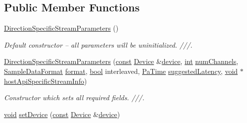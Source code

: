 \subsection*{Public Member Functions}
\begin{DoxyCompactItemize}
\item 
\hyperlink{classportaudio_1_1_direction_specific_stream_parameters_a08e8437d39003fbeb2d7006bfd96ff8f}{Direction\+Specific\+Stream\+Parameters} ()
\begin{DoxyCompactList}\small\item\em Default constructor -- all parameters will be uninitialized. ///. \end{DoxyCompactList}\item 
\hyperlink{classportaudio_1_1_direction_specific_stream_parameters_a10ebe8075f71d3980234ca4d950ac0d3}{Direction\+Specific\+Stream\+Parameters} (\hyperlink{getopt1_8c_a2c212835823e3c54a8ab6d95c652660e}{const} \hyperlink{classportaudio_1_1_device}{Device} \&\hyperlink{classportaudio_1_1_direction_specific_stream_parameters_a1019655e255fed4a30d30d5817e630cf}{device}, \hyperlink{xmltok_8h_a5a0d4a5641ce434f1d23533f2b2e6653}{int} \hyperlink{classportaudio_1_1_direction_specific_stream_parameters_a3814e4de56feaf1ac00bcbed67bdc407}{num\+Channels}, \hyperlink{namespaceportaudio_a30bc71f065706d41a5d9208ea861e4a6}{Sample\+Data\+Format} \hyperlink{_export_p_c_m_8cpp_a317afff57d87a89158c2b038d37b2b08}{format}, \hyperlink{mac_2config_2i386_2lib-src_2libsoxr_2soxr-config_8h_abb452686968e48b67397da5f97445f5b}{bool} interleaved, \hyperlink{portaudio_8h_af17a7e6d0471a23071acf8dbd7bbe4bd}{Pa\+Time} \hyperlink{classportaudio_1_1_direction_specific_stream_parameters_a7912c6f4b9e9ddec002a88c6fd8d526f}{suggested\+Latency}, \hyperlink{sound_8c_ae35f5844602719cf66324f4de2a658b3}{void} $\ast$\hyperlink{classportaudio_1_1_direction_specific_stream_parameters_a3038b3bff667eb48389c994afd0b9865}{host\+Api\+Specific\+Stream\+Info})
\begin{DoxyCompactList}\small\item\em Constructor which sets all required fields. ///. \end{DoxyCompactList}\item 
\hyperlink{sound_8c_ae35f5844602719cf66324f4de2a658b3}{void} \hyperlink{classportaudio_1_1_direction_specific_stream_parameters_a3f3e4b6d31b67ac0b70b868b21c87d11}{set\+Device} (\hyperlink{getopt1_8c_a2c212835823e3c54a8ab6d95c652660e}{const} \hyperlink{classportaudio_1_1_device}{Device} \&\hyperlink{classportaudio_1_1_direction_specific_stream_parameters_a1019655e255fed4a30d30d5817e630cf}{device})

\end{DoxyCompactItemize}
